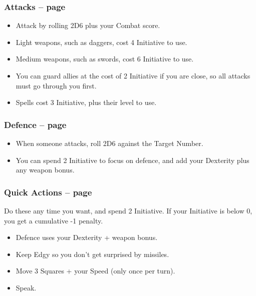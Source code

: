 \begin{multicols}{2}
\begin{itemize}
\end{itemize}

\subsubsection{Attacks -- page \pageref{attack}}

\begin{itemize}

	\item{Attack by rolling 2D6 plus your Combat score.}
	\item{Light weapons, such as daggers, cost 4 Initiative to use.}
	\item{Medium weapons, such as swords, cost 6 Initiative to use.}
	\item{You can guard allies at the cost of 2 Initiative if you are close, so all attacks must go through you first.}
	\item{Spells cost 3 Initiative, plus their level to use.}

\end{itemize}

\subsubsection{Defence -- page \pageref{defence}}

\begin{itemize}

	\item{When someone attacks, roll 2D6 against the Target Number.}
	\item{You can spend 2 Initiative to focus on defence, and add your Dexterity plus any weapon bonus.}

\end{itemize}

\subsubsection{Quick Actions -- page \pageref{quickaction}}

Do these any time you want, and spend 2 Initiative.
If your Initiative is below 0, you get a cumulative -1 penalty.

\begin{itemize}

	\item{Defence uses your Dexterity + weapon bonus.}
	\item{Keep Edgy so you don't get surprised by missiles.}
	\item{Move 3 Squares + your Speed (only once per turn).}
	\item{Speak.}


\end{itemize}
\end{multicols}
